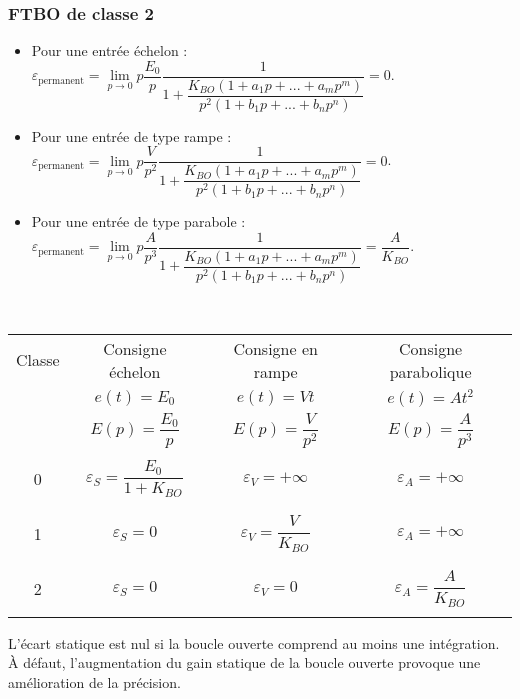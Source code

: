 \documentclass[10pt,fleqn]{article} %
\begin{document}
\subsubsection*{FTBO de classe 2}

\begin{itemize}
\item Pour une entrée échelon : 
$\varepsilon_{\text{permanent}}=\lim\limits_{p\to 0} p\dfrac{E_0}{p}\dfrac{1}{1+\dfrac{K_{BO}\left(1+a_1p+...+a_mp^m \right)}{p^{2}\left(1+b_1p+...+b_np^n\right)}} 
= 0$.
\item Pour une entrée de type rampe : 
$\varepsilon_{\text{permanent}}=\lim\limits_{p\to 0} p\dfrac{V}{p^2}\dfrac{1}{1+\dfrac{K_{BO}\left(1+a_1p+...+a_mp^m \right)}{p^{2}\left(1+b_1p+...+b_np^n\right)}} 
=0$.
\item Pour une entrée de type parabole : 
$\varepsilon_{\text{permanent}}=\lim\limits_{p\to 0} p\dfrac{A}{p^3}\dfrac{1}{1+\dfrac{K_{BO}\left(1+a_1p+...+a_mp^m \right)}{p^{2}\left(1+b_1p+...+b_np^n\right)}} 
=\dfrac{A}{K_{BO}}$.
\end{itemize}


\begin{resultat} ~\\

\begin{center}
\begin{tabular}{|c|c|c|c|}
\hline 
Classe & Consigne échelon & Consigne en rampe & Consigne parabolique \\
& $e(t)=E_0$ & $e(t)=V t $ & $e(t)=At^2$ \\ 
& $E(p)=\dfrac{E_0}{p}$ & $E(p)=\dfrac{V}{p^2}$ & $E(p)=\dfrac{A}{p^3}$ \\ 
\hline \hline 
&&&\\
0 & $\varepsilon_S = \dfrac{E_0}{1+K_{BO}} $ & $\varepsilon_V = +\infty$ & $\varepsilon_A = +\infty$ \\
&&&\\
\hline 
&&&\\
1 & $\varepsilon_S = 0$ & $\varepsilon_V = \dfrac{V}{K_{BO}} $ & $\varepsilon_A = +\infty$ \\
&&&\\
\hline 
&&&\\
2 & $\varepsilon_S = 0 $ & $\varepsilon_V = 0$ & $\varepsilon_A = \dfrac{A}{K_{BO}}$ \\
&&&\\
\hline 
\end{tabular}
\end{center}

\begin{rem}
L'écart statique est nul si la boucle ouverte comprend au moins une intégration. À défaut, l'augmentation du gain statique de la boucle ouverte provoque une amélioration de la précision.
\end{rem}

\end{resultat}
\end{document}
